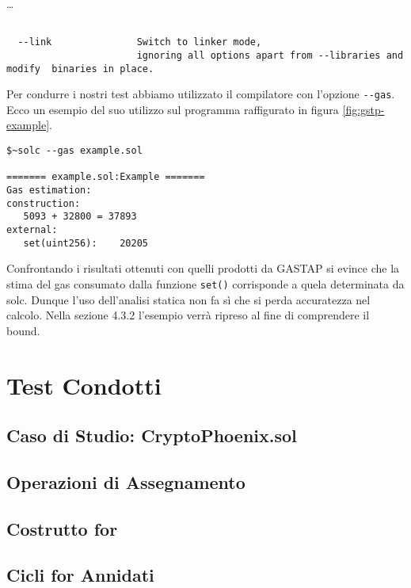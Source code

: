 \ldots

\begin{lstlisting}

  --link               Switch to linker mode,            
                       ignoring all options apart from --libraries and modify  binaries in place.

\end{lstlisting}

Per condurre i nostri test abbiamo utilizzato il compilatore con l'opzione \verb|--gas|. Ecco un esempio del suo utilizzo sul programma raffigurato in figura \ref{fig:gstp-example}.

\begin{lstlisting}
$~solc --gas example.sol 

======= example.sol:Example =======
Gas estimation:
construction:
   5093 + 32800 = 37893
external:
   set(uint256):	20205

\end{lstlisting}

Confrontando i risultati ottenuti con quelli prodotti da GASTAP si evince che la stima del gas consumato dalla funzione \verb|set()| corrisponde a quela determinata da solc. Dunque l'uso dell'analisi statica non fa sì che si perda accuratezza nel calcolo.\newline
\indent Nella sezione 4.3.2 l'esempio verrà ripreso al fine di comprendere il bound.\newline


\section{Test Condotti}



    \subsection{Caso di Studio: CryptoPhoenix.sol}

    \subsection{Operazioni di Assegnamento}

    \subsection{Costrutto for}
    
    \subsection{Cicli for Annidati}

